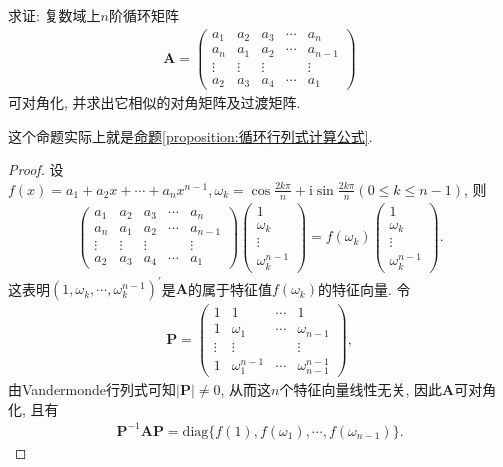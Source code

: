 \documentclass[../../main.tex]{subfiles}
\begin{document}
\begin{proposition}[循环矩阵一定可对角化]\label{proposition:循环矩阵一定可对角化}
求证: 复数域上\(n\)阶循环矩阵
\begin{align*}
\boldsymbol{A}=\begin{pmatrix}
a_{1}&a_{2}&a_{3}&\cdots&a_{n}\\
a_{n}&a_{1}&a_{2}&\cdots&a_{n - 1}\\
\vdots&\vdots&\vdots&&\vdots\\
a_{2}&a_{3}&a_{4}&\cdots&a_{1}
\end{pmatrix}
\end{align*}
可对角化, 并求出它相似的对角矩阵及过渡矩阵.
\end{proposition}
\begin{note}
这个命题实际上就是\hyperref[proposition:循环行列式计算公式]{命题\ref{proposition:循环行列式计算公式}}.
\end{note}
\begin{proof}
设\(f(x)=a_{1}+a_{2}x+\cdots+a_{n}x^{n - 1},\omega_{k}=\cos\frac{2k\pi}{n}+\mathrm{i}\sin\frac{2k\pi}{n}(0\leqslant  k\leqslant  n - 1)\), 则
\begin{align*}
\begin{pmatrix}
a_{1}&a_{2}&a_{3}&\cdots&a_{n}\\
a_{n}&a_{1}&a_{2}&\cdots&a_{n - 1}\\
\vdots&\vdots&\vdots&&\vdots\\
a_{2}&a_{3}&a_{4}&\cdots&a_{1}
\end{pmatrix}\begin{pmatrix}
1\\
\omega_{k}\\
\vdots\\
\omega_{k}^{n - 1}
\end{pmatrix}=f(\omega_{k})\begin{pmatrix}
1\\
\omega_{k}\\
\vdots\\
\omega_{k}^{n - 1}
\end{pmatrix}.
\end{align*}
这表明\((1,\omega_{k},\cdots,\omega_{k}^{n - 1})^{\prime}\)是\(\boldsymbol{A}\)的属于特征值\(f(\omega_{k})\)的特征向量. 令
\begin{align*}
\boldsymbol{P}=\begin{pmatrix}
1&1&\cdots&1\\
1&\omega_{1}&\cdots&\omega_{n - 1}\\
\vdots&\vdots&&\vdots\\
1&\omega_{1}^{n - 1}&\cdots&\omega_{n - 1}^{n - 1}
\end{pmatrix},
\end{align*}
由Vandermonde行列式可知\(\vert\boldsymbol{P}\vert\neq 0\), 从而这\(n\)个特征向量线性无关, 因此\(\boldsymbol{A}\)可对角化, 且有
\begin{align*}
\boldsymbol{P}^{-1}\boldsymbol{AP}=\mathrm{diag}\{f(1),f(\omega_{1}),\cdots,f(\omega_{n - 1})\}.
\end{align*} 
\end{proof}
\end{document}
